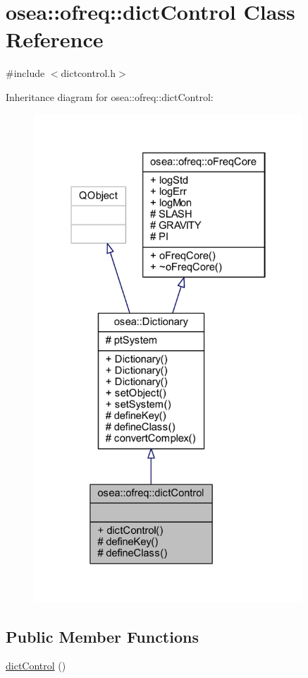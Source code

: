 \hypertarget{classosea_1_1ofreq_1_1dict_control}{\section{osea\-:\-:ofreq\-:\-:dict\-Control Class Reference}
\label{classosea_1_1ofreq_1_1dict_control}
}


{\ttfamily \#include $<$dictcontrol.\-h$>$}



Inheritance diagram for osea\-:\-:ofreq\-:\-:dict\-Control\-:
\nopagebreak
\begin{figure}[H]
\begin{center}
\leavevmode
\includegraphics[width=286pt]{classosea_1_1ofreq_1_1dict_control__inherit__graph}
\end{center}
\end{figure}
\subsection*{Public Member Functions}
\begin{DoxyCompactItemize}
\item 
\hyperlink{classosea_1_1ofreq_1_1dict_control_a77963b6f01bf653ce573862d67e0fe10}{dict\-Control} ()
\end{DoxyCompactItemize}
